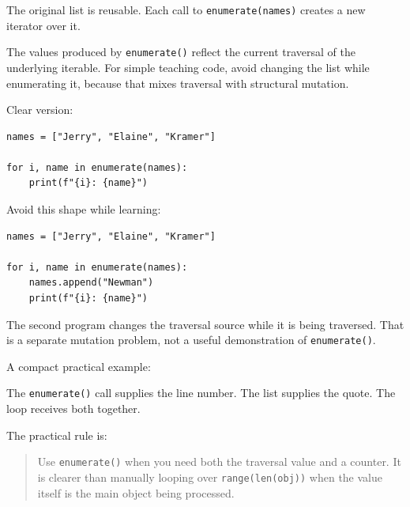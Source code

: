 The original list is reusable. Each call to \texttt{enumerate(names)} creates a new iterator over it.

The values produced by \texttt{enumerate()} reflect the current traversal of the underlying iterable. For simple teaching code, avoid changing the list while enumerating it, because that mixes traversal with structural mutation.

Clear version:

\begin{verbatim}
names = ["Jerry", "Elaine", "Kramer"]

for i, name in enumerate(names):
    print(f"{i}: {name}")
\end{verbatim}

Avoid this shape while learning:

\begin{verbatim}
names = ["Jerry", "Elaine", "Kramer"]

for i, name in enumerate(names):
    names.append("Newman")
    print(f"{i}: {name}")
\end{verbatim}

The second program changes the traversal source while it is being traversed. That is a separate mutation problem, not a useful demonstration of \texttt{enumerate()}.

A compact practical example:

The \texttt{enumerate()} call supplies the line number. The list supplies the quote. The loop receives both together.

The practical rule is:

\begin{quote}
Use \texttt{enumerate()} when you need both the traversal value and a counter. It is clearer than manually looping over \texttt{range(len(obj))} when the value itself is the main object being processed.
\end{quote}